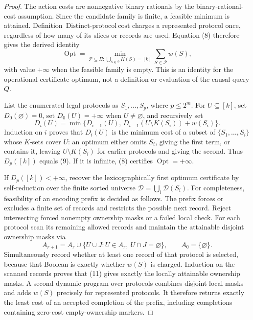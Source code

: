 \documentclass{article}
\begin{document}
\begin{proof}
The action costs are nonnegative binary rationals by the binary-rational-cost assumption.  Since the candidate family is finite, a feasible minimum is attained.  Definition~\(\mathrm{Distinct\text{-}protocol\ cost}\) charges a represented protocol once, regardless of how many of its slices or records are used.  Equation (8) therefore gives the derived identity
\[
  \operatorname{Opt}
  =\min_{\mathcal P\subseteq\Pi:\,\bigcup_{S\in\mathcal P}K(S)=[k]}
       \sum_{S\in\mathcal P}w(S), \tag{9}
\]
with value \(+\infty\) when the feasible family is empty.  This is an identity for the operational certificate optimum, not a definition or evaluation of the causal query \(Q\).

List the enumerated legal protocols as \(S_1,\ldots,S_p\), where \(p\leq2^m\).  For \(U\subseteq[k]\), set \(D_0(\varnothing)=0\), set \(D_0(U)=+\infty\) when \(U\neq\varnothing\), and recursively set
\[
  D_i(U)=\min\bigl\{D_{i-1}(U),\,
  D_{i-1}(U\setminus K(S_i))+w(S_i)\bigr\}. \tag{10}
\]
Induction on \(i\) proves that \(D_i(U)\) is the minimum cost of a subset of \(\{S_1,\ldots,S_i\}\) whose \(K\)-sets cover \(U\): an optimum either omits \(S_i\), giving the first term, or contains it, leaving \(U\setminus K(S_i)\) for earlier protocols and giving the second.  Thus \(D_p([k])\) equals (9).  If it is infinite, (8) certifies \(\operatorname{Opt}=+\infty\).

If \(D_p([k])<+\infty\), recover the lexicographically first optimum certificate by self-reduction over the finite sorted universe \(\mathcal D=\bigcup_i\mathcal D(S_i)\).  For completeness, feasibility of an encoding prefix is decided as follows.  The prefix forces or excludes a finite set of records and restricts the possible next record.  Reject intersecting forced nonempty ownership masks or a failed local check.  For each protocol scan its remaining allowed records and maintain the attainable disjoint ownership masks via
\[
  A_{r+1}=A_r\cup
  \{U\cup J:U\in A_r,\ U\cap J=\varnothing\},
  \qquad A_0=\{\varnothing\}. \tag{11}
\]
Simultaneously record whether at least one record of that protocol is selected, because that Boolean is exactly whether \(w(S)\) is charged.  Induction on the scanned records proves that (11) gives exactly the locally attainable ownership masks.  A second dynamic program over protocols combines disjoint local masks and adds \(w(S)\) precisely for represented protocols.  It therefore returns exactly the least cost of an accepted completion of the prefix, including completions containing zero-cost empty-ownership markers.


\end{proof}
\end{document}
